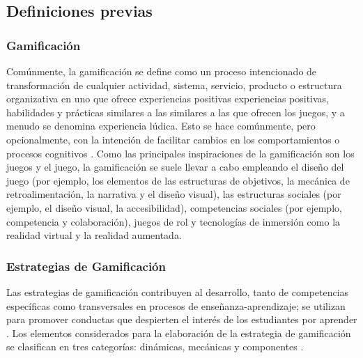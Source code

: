 \subsection{Definiciones previas}


\subsubsection*{Gamificación}

Comúnmente, la gamificación se define como un proceso intencionado de transformación de cualquier actividad, sistema, servicio, producto o estructura organizativa en uno que ofrece experiencias positivas experiencias positivas, habilidades y prácticas similares a las similares a las que ofrecen los juegos, y a menudo se denomina experiencia lúdica. Esto se hace comúnmente, pero opcionalmente, con la intención de facilitar cambios en los comportamientos o procesos cognitivos \cite{gamificationRef}. Como las principales inspiraciones de la gamificación son los juegos y el juego, la gamificación se suele llevar a cabo empleando el diseño del juego (por ejemplo, los elementos de las estructuras de objetivos, la mecánica de retroalimentación, la narrativa y el diseño visual), las estructuras sociales (por ejemplo, el diseño visual, la accesibilidad), competencias sociales (por ejemplo, competencia y colaboración), juegos de rol y tecnologías de inmersión como la realidad virtual y la realidad aumentada.


\subsubsection*{Estrategias de Gamificación}

Las estrategias de gamificación contribuyen al desarrollo, tanto de competencias específicas como transversales en procesos de enseñanza-aprendizaje; se utilizan para promover conductas que despierten el interés de los estudiantes por aprender \cite{Gonzalez}. Los elementos considerados para la elaboración de la estrategia de gamificación se clasifican en tres categorías: dinámicas, mecánicas y componentes \cite{Gee}.

